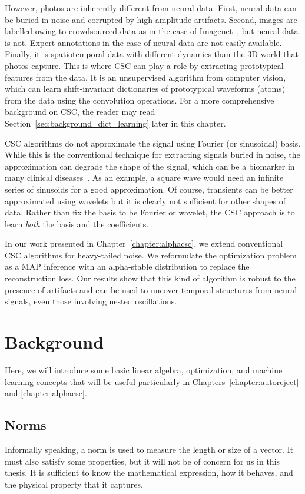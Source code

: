 However, photos are inherently different from neural data. First, neural data can be buried in noise and corrupted by high amplitude artifacts. Second, images are labelled owing to crowdsourced data as in the case of  Imagenet~\citep{deng2009imagenet}, but neural data is not. 
Expert annotations in the case of neural data are not easily available.
Finally, it is spatiotemporal data with different dynamics than the 3D world that photos capture. This is where \ac{CSC} can play a role by extracting prototypical features from the data. It is an unsupervised algorithm from computer vision, which can learn shift-invariant dictionaries of prototypical waveforms (atoms) from the data using the convolution operations. For a more comprehensive background on \ac{CSC}, the reader may read Section~\ref{sec:background_dict_learning} later in this chapter.

\ac{CSC} algorithms do not approximate the signal using Fourier (or sinusoidal) basis. While this is the conventional technique for extracting signals buried in noise, the approximation can degrade the shape of the signal, which can be a biomarker in many clinical diseases~\citep{cole2017brain}. As an example, a square wave would need an infinite series of sinusoids for a good approximation. Of course, transients can be better approximated using wavelets but it is clearly not sufficient for other shapes of data. Rather than fix the basis to be Fourier or wavelet, the \ac{CSC} approach is to learn \emph{both} the basis and the coefficients.

In our work presented in Chapter~\ref{chapter:alphacsc}, we extend conventional \ac{CSC} algorithms for heavy-tailed noise. We reformulate the optimization problem as a \ac{MAP} inference with an alpha-stable distribution to replace the reconstruction loss. Our results show that this kind of algorithm is robust to the presence of artifacts and can be used to uncover temporal structures from neural signals, even those involving nested oscillations.

\clearpage
\section{Background}

Here, we will introduce some basic linear algebra, optimization, and machine learning concepts that will be useful particularly in Chapters~\ref{chapter:autoreject} and \ref{chapter:alphacsc}.

\subsection{Norms}
Informally speaking, a norm is used to measure the length or size of a vector. It must also satisfy some properties, but it will not be of concern for us in this thesis. It is sufficient to know the mathematical expression, how it behaves, and the physical property that it captures.
\theoremstyle{definition}
\newtheorem{definition}{Definition}[chapter]

